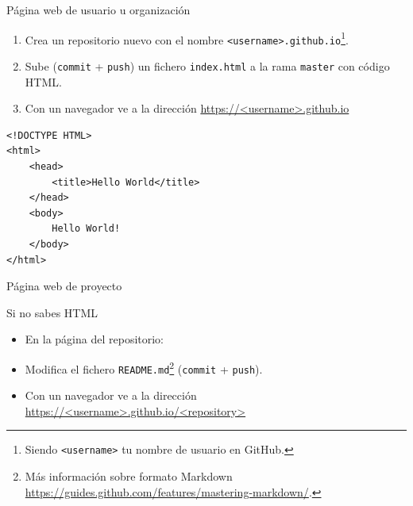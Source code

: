 \documentclass[xcolor={usenames,svgnames,dvipsnames}]{beamer}
\begin{document}
\begin{frame}[fragile,label={sec:org082b8c2}]{Página web de usuario u organización}
 \begin{enumerate}
\item Crea un repositorio nuevo con el nombre \texttt{<username>.github.io}\footnote{Siendo \texttt{<username>} tu nombre de usuario en GitHub.}.
\item Sube (\texttt{commit} + \texttt{push}) un fichero \texttt{index.html} a la rama \texttt{master} con código HTML.
\item Con un navegador ve a la dirección \url{https://<username>.github.io}
\end{enumerate}

\lstset{language=HTML,label= ,caption= ,captionpos=b,numbers=none}
\begin{lstlisting}
<!DOCTYPE HTML>
<html>
	<head>
		<title>Hello World</title>
	</head>
	<body>
		Hello World!
	</body>
</html>
\end{lstlisting}
\end{frame}

\begin{frame}[fragile,label={sec:org1ce4ebb}]{Página web de proyecto}
 \begin{block}{Si no sabes HTML}
\begin{itemize}
\item En la página del repositorio:
\end{itemize}

\begin{center}

\end{center}

\begin{itemize}
\item Modifica el fichero \texttt{README.md}\footnote{Más información sobre formato Markdown \url{https://guides.github.com/features/mastering-markdown/}.} (\texttt{commit} + \texttt{push}).

\item Con un navegador ve a la dirección \url{https://<username>.github.io/<repository>}
\end{itemize}
\end{block}
\end{frame}
\end{document}
